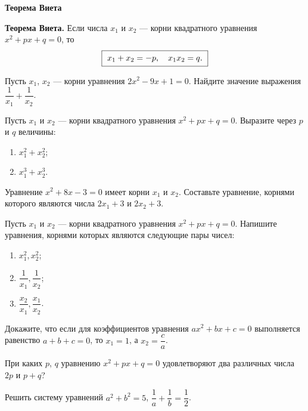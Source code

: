 \documentclass{article}
\begin{document}
    \large

    \begin{center}
        \textbf{Теорема Виета}
    \end{center}

    \textbf {Теорема Виета.} Если числа $x_1$ и $x_2$ --- корни квадратного уравнения $x^2 + px + q = 0$, то
    \[\boxed{~x_1 + x_2=-p, \quad x_{1}x_2=q.\strut~}\]

    \begin{enumerate_boxed}

        \item Пусть $x_1$, $x_2$ --- корни уравнения $2x^2-9x+1=0$.
        Найдите значение выражения $\dfrac1{x_1}+\dfrac1{x_2}$.

        \item Пусть $x_1$ и $x_2$ --- корни квадратного уравнения $x^2+px+q=0$.
        Выразите через $p$ и $q$ величины:
        \begin{enumerate}
            \item $x_1^2+x_2^2$;
            \item $x_1^3+x_2^3.$
        \end{enumerate}

        \item Уравнение $x^2+8x-3=0$ имеет корни $x_1$ и $x_2$.
        Составьте уравнение, корнями которого являются числа $2x_1+3$ и $2x_2+3$.

        \item Пусть $x_1$ и $x_2$ --- корни квадратного уравнения $x^2+px+q=0$.
        Напишите уравнения, корнями которых являются следующие пары чисел:
        \begin{enumerate}
            \item $x_1^2, x_2^2$;
            \item  $\dfrac1{x_1}, \dfrac1{x_2}$;
            \item  $\dfrac{x_2}{x_1}, \dfrac{x_1}{x_2}$.
        \end{enumerate}

        \item Докажите, что если для коэффициентов уравнения $ax^2+bx+c=0$ выполняется равенство $a+b+c=0$, то $x_1=1$, а $x_2=\dfrac{c}{a}$.

        \item При каких $p$, $q$ уравнению $x^2 + px + q = 0$ удовлетворяют два различных числа $2p$ и $p + q$?

        \item Решить систему уравнений $a^2+b^2=5$, $\dfrac1a+\dfrac1b=\dfrac12$.


\end{enumerate_boxed}
\end{document}
